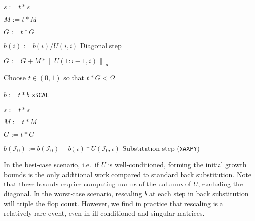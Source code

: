 \documentclass{article}
\begin{document}
\begin{algorithm}[H]
\begin{algorithmic}
    \State \(s := t * s\)

    \State \(M := t * M\)

    \State \(G := t * G\)

    \EndIf

    \State \(b(i) := b(i) / U(i,i)\) \Comment Diagonal step

    \State \(G := G + M * \left\lVert U(1:i-1,i) \right\rVert_\infty\)


    \State Choose \(t\in\left(0,1\right)\) so that \(t *G < \Omega\)

    \State \(b := t *b\) \Comment \texttt{xSCAL}

    \State \(s := t *s\)

    \State \(M := t*M\)

    \State \(G := t *G\)
    
    \EndIf

    \State \(b(\mathcal{I}_0) := b(\mathcal{I}_0) - b(i) * U(\mathcal{I}_0,i)\) \Comment Substitution step (\texttt{xAXPY})

    \EndFor

    \EndIf

    \EndProcedure

  \end{algorithmic}
\end{algorithm}
\noindent
In the best-case scenario, i.e.\ if \(U\) is well-conditioned, forming
the initial growth bounds is the only additional work compared to
standard back substitution. Note that these bounds require computing
norms of the columns of \(U\), excluding the diagonal. In the
worst-case scenario, rescaling \(b\) at each step in back substitution
will triple the flop count. However, we find in practice that
rescaling is a relatively rare event, even in ill-conditioned and
singular matrices.
\end{document}
